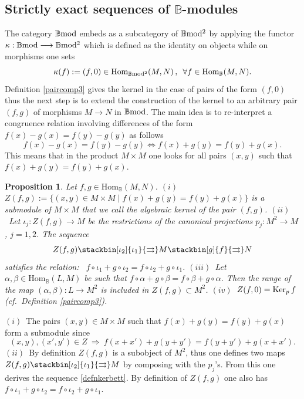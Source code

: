 \documentclass[12pt]{article}
\newtheorem{prop}[thm]{Proposition}
\def\Hom{{\rm Hom}}
\def\Kpr{{\rm Ker}_p\,}
\def\B{{\mathbb B}}
\def\Strgly{Strictly }
\def\qqq{\,,\,~\forall}
\newcommand{\cf}{{\it cf.}}
\def\Hom {{\mbox{Hom}}}
\def\bmod{{\rm \B mod}}
\def\bm2{{\rm \B mod^2}}
\begin{document}
\subsection{\Strgly exact sequences of $\B$-modules}\label{sectstrongexact}

The category $\bmod$ embeds as a subcategory of $\bm2$ by applying the functor $\kappa:\bmod\longrightarrow \bm2$  which is defined as  the identity on objects while  on morphisms one sets 
\begin{equation}\label{functoriota}
	\kappa(f):=(f,0)\in \Hom_\bm2(M,N)\qqq f\in \Hom_\B(M,N).
\end{equation}
 Definition \ref{paircomp3} gives the kernel in the case of pairs of the form $(f,0)$ thus the next step is to extend the construction of the kernel to an arbitrary pair $(f,g)$ of morphisms $M\to N$ in $\bmod$. The main idea is to re-interpret a congruence relation involving differences of the form $f(x)-g(x)=f(y)-g(y)$ as follows
$$
f(x)-g(x)=f(y)-g(y)\iff f(x)+g(y)=f(y)+g(x).
$$
This means that in the product $M\times M$ one looks for  all pairs $(x,y)$ such that $f(x)+g(y)=f(y)+g(x)$.  
\begin{prop}\label{ker1} Let $f,g\in \Hom_\B(M,N)$. \newline
$(i)$~$Z(f,g):=\{(x,y)\in M\times M\mid f(x)+g(y)=f(y)+g(x)\}$ is a submodule of $M\times M$ that we call the algebraic kernel of the pair $(f,g)$. \newline 
$(ii)$~Let $\iota_j:Z(f,g)\to M$ be the restrictions of the canonical projections $p_j:M^2\to M$, $j=1,2$. The sequence
\begin{equation}\label{defnkerbett}
	Z(f,g) \stackbin[\iota_2]{\iota_1}{\rightrightarrows} M  \stackbin[g]{f}{\rightrightarrows} N
\end{equation}	
satisfies the relation:~ $f\circ \iota_1+g\circ \iota_2=f\circ \iota_2+g\circ \iota_1$.\newline
$(iii)$~Let $\alpha,\beta\in \Hom_\B(L,M)$ be such that $f\circ \alpha+g\circ \beta=f\circ \beta+g\circ \alpha$. Then the range of the map $(\alpha,\beta):L\to M^2$ is included in $Z(f,g)\subset M^2$. \newline
$(iv)$~$Z(f,0)=\Kpr f$ (\cf~Definition \ref{paircomp3}). \end{prop}
\proof $(i)$~The pairs $(x,y)\in M\times M$ such that $f(x)+g(y)=f(y)+g(x)$ form a submodule  since 
$$
(x,y),(x',y')\in Z~\Rightarrow~ f(x+x')+g(y+y')=f(y+y')+g(x+x').
$$
$(ii)$~By definition $Z(f,g)$ is  a subobject of $M^2$, thus one defines two maps $Z(f,g)\stackbin[\iota_2]{\iota_1}{\rightrightarrows} M$ by composing with the $p_j$'s. From this one derives the sequence \eqref{defnkerbett}. By definition of $Z(f,g)$ one also has $f\circ \iota_1+g\circ \iota_2=f\circ \iota_2+g\circ \iota_1$.\newline
\end{document}
